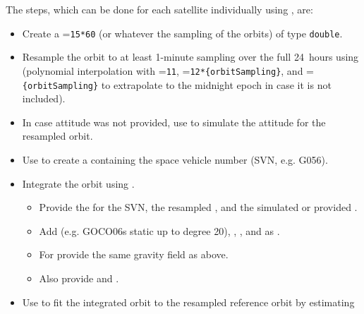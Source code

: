 The steps, which can be done for each satellite individually using , are:
\begin{itemize}
  \item Create a  =\verb|15*60|
        (or whatever the sampling of the orbits) of type \verb|double|.
  \item Resample the orbit to at least 1-minute sampling over the full 24~hours using 
        (polynomial interpolation with =\verb|11|, =\verb|12*{orbitSampling}|, and
        =\verb|{orbitSampling}| to extrapolate to the midnight epoch in case it is not included).
  \item In case attitude was not provided, use  to simulate the attitude for the resampled orbit.
  \item Use  to create a  containing the space vehicle number (SVN, e.g. G056).
  \item Integrate the orbit using .
  \begin{itemize}
    \item Provide the  for the SVN, the resampled ,
          and the simulated or provided .
    \item Add  (e.g. GOCO06s static up to degree 20),
          , , and
           as .
    \item For  provide the same gravity field as above.
    \item Also provide  and .
  \end{itemize}
  \item Use  to fit the integrated orbit to the resampled reference orbit by estimating

\end{itemize}
